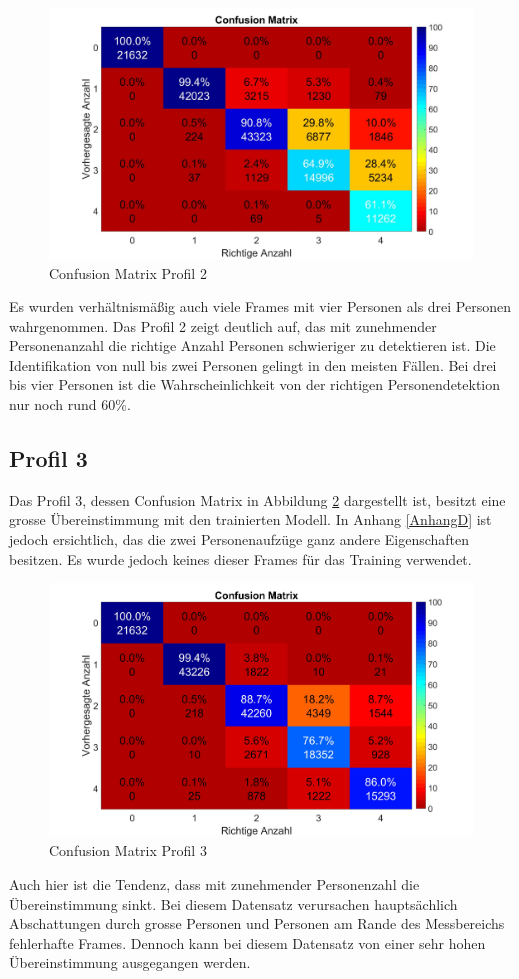 \begin{figure}[H]
	\centering
		\label{fig:profil2}
	\includegraphics[width=0.55\linewidth]{fig/Profil_2m}
	\caption[Confusion Matrix Profil 2]{Confusion Matrix Profil 2}

\end{figure}
 Es wurden verhältnismäßig auch viele Frames mit vier Personen als drei Personen wahrgenommen. Das Profil 2 zeigt deutlich auf, das mit zunehmender Personenanzahl die richtige Anzahl Personen schwieriger zu detektieren ist. Die Identifikation von null bis zwei Personen gelingt in den meisten Fällen. Bei drei bis vier Personen ist die Wahrscheinlichkeit von der richtigen Personendetektion nur noch rund 60\%.

\subsection{Profil 3}
\label{subsec:Profil3}
Das Profil 3, dessen Confusion Matrix in Abbildung \ref{fig:profil3} dargestellt ist, besitzt eine grosse Übereinstimmung mit den trainierten Modell. In Anhang \ref{AnhangD} ist jedoch ersichtlich, das die zwei Personenaufzüge ganz andere Eigenschaften besitzen. Es wurde jedoch keines dieser Frames für das Training verwendet.

\begin{figure}[H]
	\centering
	\includegraphics[width=0.55\linewidth]{fig/Profil_3m}
	\caption[Confusion Matrix Profil 3]{Confusion Matrix Profil 3}
		\label{fig:profil3}
\end{figure}

Auch hier ist die Tendenz, dass mit zunehmender Personenzahl die Übereinstimmung sinkt. Bei diesem Datensatz verursachen hauptsächlich Abschattungen durch grosse Personen und Personen am Rande des Messbereichs fehlerhafte Frames. Dennoch kann bei diesem Datensatz von einer sehr hohen Übereinstimmung  ausgegangen werden.

